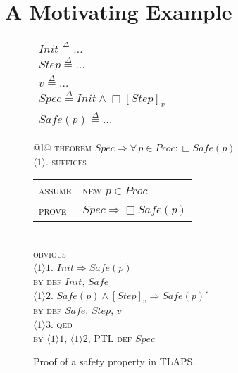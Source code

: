 \documentclass{easychair}
\renewcommand{\implies}{\Rightarrow}
\newcommand{\kw}[1]{\textsc{#1}}  %
\newcommand{\ps}[2]{\ensuremath{\langle #1 \rangle #2}}
\newcommand{\deq}{\mathrel{\stackrel{\scriptscriptstyle\Delta}{=}}}
\def\A{\forall\,}
\begin{document}
\section{A Motivating Example} \label{sec:motivation}

\begin{figure}[bp]
  \centering
  \begin{minipage}[t]{.3\linewidth}
    \begin{tabular}[t]{@{}l@{}}
      $Init \deq \ldots$\\
      $Step \deq \ldots$\\
      $v \deq \ldots$\\
      $Spec \deq Init \land \Box[Step]_v$\\[.5ex]
      $Safe(p) \deq \ldots$
    \end{tabular}
  \end{minipage}
  \begin{minipage}[t]{.55\linewidth}
    \begin{tabular}[t]{@{}l@{}}
      \kw{theorem} $Spec \implies \A p \in Proc : \Box Safe(p)$\\
      \ps{1}{.} \kw{suffices}%
                  \begin{tabular}[t]{@{\ }l@{\ }l}
                    \kw{assume} & \kw{new} $p \in Proc$\\
                    \kw{prove}  & $Spec \implies \Box Safe(p)$
                  \end{tabular}\\[-.4em]
      \quad\kw{obvious}\\
      \ps{1}{1.} $Init \implies Safe(p)$\\
      \quad\kw{by} \kw{def} $Init$, $Safe$\\
      \ps{1}{2.}
         $Safe(p) \land [Step]_v \implies Safe(p)'$\\
      \quad\kw{by} \kw{def}
        $Safe$, $Step$, $v$\\
      \ps{1}{3.} \kw{qed}\\
      \quad\kw{by} \ps{1}{1}, \ps{1}{2},
      PTL \kw{def} $Spec$
    \end{tabular}
  \end{minipage}
  \caption{Proof of a safety property in TLAPS.}
  \label{fig:safety-example}
\end{figure}
\end{document}
